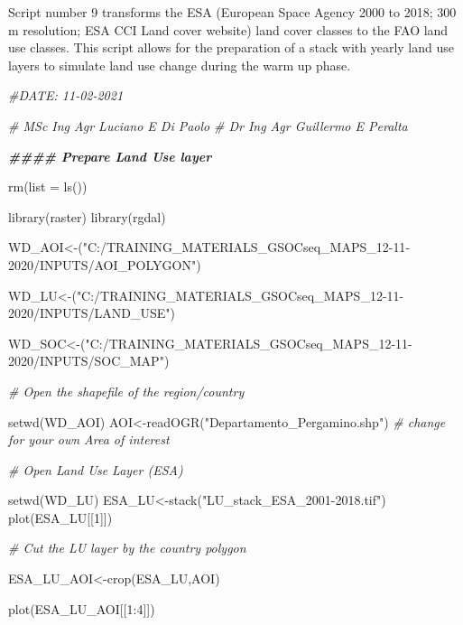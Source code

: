 \documentclass[
  10pt,
  b5paper,
]{book}
\newenvironment{Shaded}{\begin{snugshade}}{\end{snugshade}}
\newcommand{\AttributeTok}[1]{\textcolor[rgb]{0.77,0.63,0.00}{#1}}
\newcommand{\CommentTok}[1]{\textcolor[rgb]{0.56,0.35,0.01}{\textit{#1}}}
\newcommand{\DecValTok}[1]{\textcolor[rgb]{0.00,0.00,0.81}{#1}}
\newcommand{\DocumentationTok}[1]{\textcolor[rgb]{0.56,0.35,0.01}{\textbf{\textit{#1}}}}
\newcommand{\FunctionTok}[1]{\textcolor[rgb]{0.00,0.00,0.00}{#1}}
\newcommand{\NormalTok}[1]{#1}
\newcommand{\OtherTok}[1]{\textcolor[rgb]{0.56,0.35,0.01}{#1}}
\newcommand{\SpecialCharTok}[1]{\textcolor[rgb]{0.00,0.00,0.00}{#1}}
\newcommand{\StringTok}[1]{\textcolor[rgb]{0.31,0.60,0.02}{#1}}
\begin{document}
Script number 9 transforms the ESA (European Space Agency 2000 to 2018; 300 m resolution; ESA CCI Land cover website) land cover classes to the FAO land use classes. This script allows for the preparation of a stack with yearly land use layers to simulate land use change during the warm up phase.

\begin{Shaded}
\begin{Highlighting}[]
\CommentTok{\#DATE: 11{-}02{-}2021}

\CommentTok{\# MSc Ing Agr Luciano E Di Paolo}
\CommentTok{\# Dr Ing Agr Guillermo E Peralta}

\DocumentationTok{\#\#\#\# Prepare Land Use layer }

\FunctionTok{rm}\NormalTok{(}\AttributeTok{list =} \FunctionTok{ls}\NormalTok{())}

\FunctionTok{library}\NormalTok{(raster)}
\FunctionTok{library}\NormalTok{(rgdal)}

\NormalTok{WD\_AOI}\OtherTok{\textless{}{-}}\NormalTok{(}\StringTok{"C:/TRAINING\_MATERIALS\_GSOCseq\_MAPS\_12{-}11{-}2020/INPUTS/AOI\_POLYGON"}\NormalTok{)}

\NormalTok{WD\_LU}\OtherTok{\textless{}{-}}\NormalTok{(}\StringTok{"C:/TRAINING\_MATERIALS\_GSOCseq\_MAPS\_12{-}11{-}2020/INPUTS/LAND\_USE"}\NormalTok{)}

\NormalTok{WD\_SOC}\OtherTok{\textless{}{-}}\NormalTok{(}\StringTok{"C:/TRAINING\_MATERIALS\_GSOCseq\_MAPS\_12{-}11{-}2020/INPUTS/SOC\_MAP"}\NormalTok{)}

\CommentTok{\# Open the shapefile of the region/country}

\FunctionTok{setwd}\NormalTok{(WD\_AOI)}
\NormalTok{AOI}\OtherTok{\textless{}{-}}\FunctionTok{readOGR}\NormalTok{(}\StringTok{"Departamento\_Pergamino.shp"}\NormalTok{) }\CommentTok{\# change for your own Area of interest}

\CommentTok{\# Open Land Use Layer (ESA)}

\FunctionTok{setwd}\NormalTok{(WD\_LU)}
\NormalTok{ESA\_LU}\OtherTok{\textless{}{-}}\FunctionTok{stack}\NormalTok{(}\StringTok{"LU\_stack\_ESA\_2001{-}2018.tif"}\NormalTok{)}
\FunctionTok{plot}\NormalTok{(ESA\_LU[[}\DecValTok{1}\NormalTok{]])}

\CommentTok{\# Cut the LU layer by the country polygon}

\NormalTok{ESA\_LU\_AOI}\OtherTok{\textless{}{-}}\FunctionTok{crop}\NormalTok{(ESA\_LU,AOI)}

\FunctionTok{plot}\NormalTok{(ESA\_LU\_AOI[[}\DecValTok{1}\SpecialCharTok{:}\DecValTok{4}\NormalTok{]])}


\end{Highlighting}
\end{Shaded}
\end{document}

